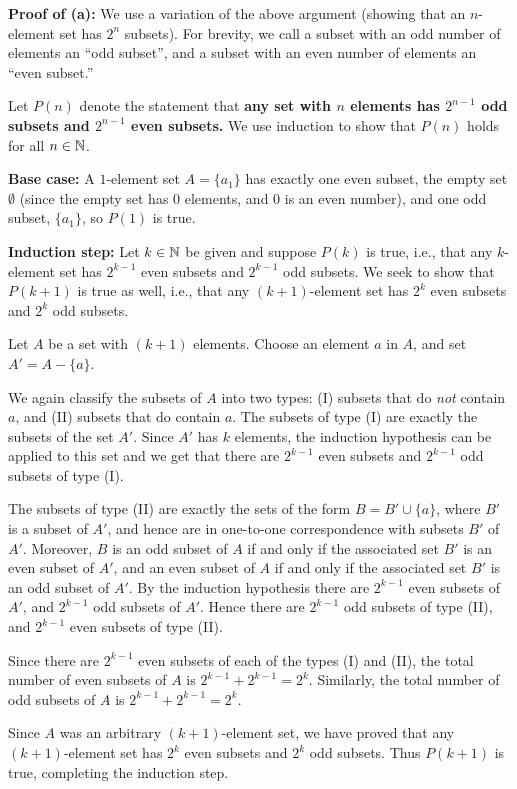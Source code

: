 \textbf{Proof of (a):}
We use a variation of the above argument (showing that an
$n$-element set has $2^n$ subsets).  For brevity, we call a subset with an odd
number of elements an ``odd subset'', and a subset with an even number of
elements an ``even subset.'' 

Let $P(n)$ denote the statement that \textbf{any set with $n$ elements has
$2^{n-1}$ odd subsets and $2^{n-1}$ even subsets.}
We use induction to show that $P(n)$ holds for all $n\in\mathbb{N}$.

\textbf{Base case:} A $1$-element set $A=\{a_1\}$ has exactly 
one even subset, the empty set $\emptyset$ (since the empty set has $0$
elements, and $0$ is an even number), and one odd subset, $\{a_1\}$, so $P(1)$
is true.

\textbf{Induction step:} 
Let $k\in\mathbb{N}$ be given and suppose 
$P(k)$ is true, i.e., that any $k$-element set has $2^{k-1}$ even subsets and
$2^{k-1}$ odd subsets. 
We seek to show that $P(k+1)$  is true as well, i.e., that
any $(k+1)$-element set has $2^{k}$ even subsets and $2^k$ odd subsets.

Let $A$ be a set with $(k+1)$ elements.  
Choose an element $a$ in $A$, and set $A'=A-\{a\}$. 

We again classify the subsets of $A$ into two types: (I) subsets that do
\emph{not} contain $a$, and (II) subsets that do contain $a$.
The subsets of type (I) are exactly the subsets of the set
$A'$. Since $A'$ has $k$ elements, the induction
hypothesis can be applied to this set and we get that there are 
$2^{k-1}$ even subsets and $2^{k-1}$ odd subsets of type (I).

The subsets of type (II) are exactly the sets of the form $B=B'\cup
\{a\}$, where $B'$ is a subset of $A'$, and hence are in one-to-one
correspondence with subsets $B'$ of $A'$.  Moreover, $B$ is
an odd subset of
$A$ if and only if the associated set $B'$ is an even subset of $A'$,
and an even subset of
$A$ if and only if the associated set $B'$ is an odd subset of $A'$.
By the
induction hypothesis there are $2^{k-1}$ even subsets of $A'$, and $2^{k-1}$
odd subsets of $A'$.   Hence there are $2^{k-1}$ odd subsets of type (II), and
$2^{k-1}$ even subsets of type (II).

Since there are $2^{k-1}$ even subsets of each of the types (I) and
(II), the total number of even subsets of  $A$ is $2^{k-1}+2^{k-1}=2^{k}$. 
Similarly, the total number of odd subsets of $A$ is $2^{k-1}+2^{k-1}=2^k$.

Since $A$ was an arbitrary $(k+1)$-element set, we have proved that any
$(k+1)$-element set has $2^{k}$ even subsets and $2^k$ odd 
subsets. Thus $P(k+1)$ is true,
completing the induction step. 

